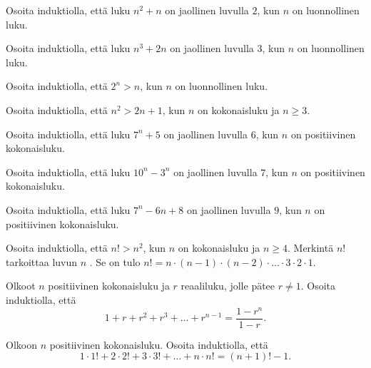 \begin{tehtavasivu}

\begin{tehtava}
	Osoita induktiolla, että luku $n^2+n$ on jaollinen luvulla $2$, kun $n$ on luonnollinen luku.
\end{tehtava}

\begin{tehtava}
	Osoita induktiolla, että luku $n^3+2n$ on jaollinen luvulla $3$, kun $n$ on luonnollinen luku.
\end{tehtava}

\begin{tehtava}
	Osoita induktiolla, että $2^n > n$, kun $n$ on luonnollinen luku.
\end{tehtava}

\begin{tehtava}
	Osoita induktiolla, että $n^2 > 2n + 1$, kun $n$ on kokonaisluku ja $n \ge 3$.
\end{tehtava}

\begin{tehtava}
	Osoita induktiolla, että luku $7^n + 5$ on jaollinen luvulla $6$, kun $n$ on positiivinen kokonaisluku.
\end{tehtava}

\begin{tehtava}
	Osoita induktiolla, että luku $10^n - 3^n$ on jaollinen luvulla $7$, kun $n$ on positiivinen kokonaisluku.
\end{tehtava}

\begin{tehtava}
	Osoita induktiolla, että luku $7^n - 6n + 8$ on jaollinen luvulla $9$, kun $n$ on positiivinen kokonaisluku.
\end{tehtava}

\begin{tehtava}
	Osoita induktiolla, että $n! > n^2$, kun $n$ on kokonaisluku ja $n \ge 4$. Merkintä $n!$ tarkoittaa luvun $n$ . Se on tulo $n! = n \cdot (n-1) \cdot (n-2) \cdot \ldots \cdot 3 \cdot 2 \cdot 1$.
\end{tehtava}

\begin{tehtava}
	Olkoot $n$ positiivinen kokonaisluku ja $r$ reaaliluku, jolle pätee $r \neq 1$. Osoita induktiolla, että 
	\[
	1 + r + r^2 + r^3 + \ldots + r^{n-1} = \frac{1-r^n}{1-r}.
	\]
\end{tehtava}

\begin{tehtava}
	Olkoon $n$ positiivinen kokonaisluku. Osoita induktiolla, että 
	\[
	1 \cdot 1! + 2 \cdot 2! + 3 \cdot 3! + \ldots + n \cdot n! = (n + 1)! - 1.
	\]
\end{tehtava}


\end{tehtavasivu}
